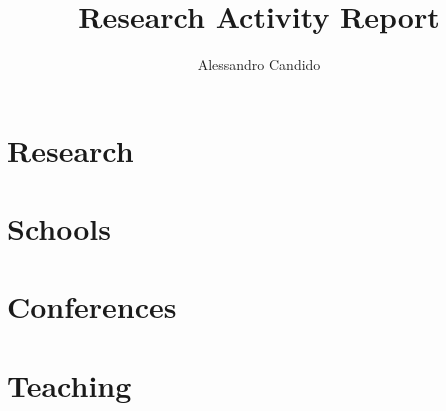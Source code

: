 \documentclass[a4paper,11pt,twocolumn]{article}
\title{Research Activity Report}
\author{Alessandro Candido}
\begin{document}
 
\notoc
\maketitle

\section{Research}
\label{sec:research}


\section{Schools}
\label{sec:schools}


\section{Conferences}
\label{sec:conferences}


\section{Teaching}
\label{sec:teaching}


\end{document}
